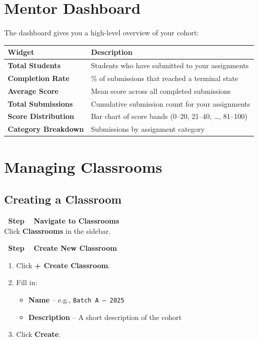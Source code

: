 \documentclass[12pt,a4paper]{article}
\newcounter{stepnum}
\newcommand{\step}[1]{%
  \stepcounter{stepnum}%
  \vspace{6pt}%
  \noindent\colorbox{mentorPurple}{\color{white}\bfseries\small\ Step \thestepnum\ }%
  \hspace{4pt}\textbf{#1}\\[4pt]%
}
\begin{document}
\section{Mentor Dashboard}

The dashboard gives you a high-level overview of your cohort:

\begin{center}
\begin{tabularx}{0.95\linewidth}{>{\bfseries}lX}
\toprule
Widget & Description \\
\midrule
Total Students    & Students who have submitted to your assignments \\
Completion Rate   & \% of submissions that reached a terminal state \\
Average Score     & Mean score across all completed submissions \\
Total Submissions & Cumulative submission count for your assignments \\
Score Distribution & Bar chart of score bands (0--20, 21--40, \ldots, 81--100) \\
Category Breakdown & Submissions by assignment category \\
\bottomrule
\end{tabularx}
\end{center}

\section{Managing Classrooms}

\subsection{Creating a Classroom}

\setcounter{stepnum}{0}

\step{Navigate to Classrooms}
Click \textbf{Classrooms} in the sidebar.

\step{Create New Classroom}
\begin{enumerate}
  \item Click \textbf{+ Create Classroom}.
  \item Fill in:
    \begin{itemize}
      \item \textbf{Name} -- e.g., \texttt{Batch A -- 2025}
      \item \textbf{Description} -- A short description of the cohort
    \end{itemize}
  \item Click \textbf{Create}.
\end{enumerate}
\end{document}
